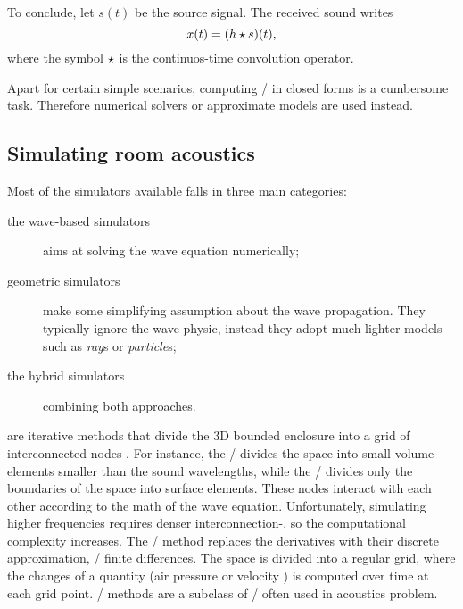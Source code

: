 \mynewline
To conclude, let $s(t)$ be the source signal. The received sound writes
\begin{equation}
    x(t) = (h \star s)(t)
    ,
\end{equation}
where the symbol $\star$ is the continuos-time convolution operator.

Apart for certain simple scenarios, computing \RIRs/ in closed forms is a cumbersome task.
Therefore numerical solvers or approximate models are used instead.

\subsection{Simulating room acoustics}\label{sec:acoustics:simulators}
Most of the simulators available falls in three main categories:
\begin{description}
    \item[the wave-based simulators] aims at solving the wave equation numerically;
    \item[geometric simulators] make some simplifying assumption about the wave propagation.
    They typically ignore the wave physic, instead they adopt much lighter models such as \textit{ray}s or \textit{particle}s;
    \item[the hybrid simulators] combining both approaches.
\end{description}

 are iterative methods that divide the 3D bounded enclosure into a grid of interconnected nodes
.
For instance, the \FEM/ divides the space into small volume elements smaller than the sound wavelengths,
while the \BEM/ divides only the boundaries of the space into surface elements.
These nodes interact with each other according to the math of the wave equation.
Unfortunately, simulating higher frequencies requires denser interconnection-, so the computational complexity increases.
The \FDTDf/ method replaces the derivatives with their discrete approximation, \ie/ finite differences.
The space is divided into a regular grid, where the changes of a quantity (air pressure or velocity ) is computed over time at each grid point.
\DWMf/ methods are a subclass of \FDTD/ often used in acoustics problem.

